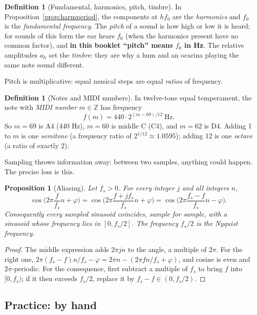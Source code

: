 \documentclass[11pt]{article}
\newtheorem{proposition}[theorem]{Proposition}
\theoremstyle{definition}
\newtheorem{definition}[theorem]{Definition}
\newcommand{\Z}{\mathbb{Z}}
\begin{document}
\begin{definition}[Fundamental, harmonics, pitch, timbre]
In Proposition~\ref{prop:harmperiod}, the components at $hf_0$ are the
\emph{harmonics} and $f_0$ is the \emph{fundamental frequency}. The \emph{pitch} of a
sound is how high or low it is heard; for sounds of this form the ear hears $f_0$
(when the harmonics present have no common factor), and \textbf{in this booklet
``pitch'' means $f_0$ in Hz}. The relative amplitudes $a_h$ set the \emph{timbre}: they
are why a hum and an ocarina playing the same note sound different.
\end{definition}

Pitch is multiplicative: equal musical steps are equal \emph{ratios} of frequency.

\begin{definition}[Notes and MIDI numbers]
In twelve-tone equal temperament, the note with \emph{MIDI number} $m\in\Z$ has
frequency
\[
f(m)=440\cdot 2^{(m-69)/12}\ \text{Hz}.
\]
So $m=69$ is A4 (440 Hz), $m=60$ is middle C (C4), and $m=62$ is D4. Adding 1 to $m$
is one \emph{semitone} (a frequency ratio of $2^{1/12}\approx1.0595$); adding 12 is
one \emph{octave} (a ratio of exactly 2).
\end{definition}

Sampling throws information away: between two samples, anything could happen. The
precise loss is this.

\begin{proposition}[Aliasing]\label{prop:alias}
Let $f_s>0$. For every integer $j$ and all integers $n$,
\[
\cos\!\Big(2\pi\frac{f}{f_s}n+\varphi\Big)=\cos\!\Big(2\pi\frac{f+jf_s}{f_s}n+\varphi\Big)
=\cos\!\Big(2\pi\frac{f_s-f}{f_s}n-\varphi\Big).
\]
Consequently every sampled sinusoid coincides, sample for sample, with a sinusoid whose
frequency lies in $[0,f_s/2]$. The frequency $f_s/2$ is the \emph{Nyquist frequency}.
\end{proposition}
\begin{proof}
The middle expression adds $2\pi jn$ to the angle, a multiple of $2\pi$. For the
right one, $2\pi(f_s-f)n/f_s-\varphi=2\pi n-(2\pi fn/f_s+\varphi)$, and cosine is even
and $2\pi$-periodic. For the consequence, first subtract a multiple of $f_s$ to bring
$f$ into $[0,f_s)$; if it then exceeds $f_s/2$, replace it by $f_s-f\in(0,f_s/2)$.
\end{proof}

\subsection{Practice: by hand}
\end{document}
